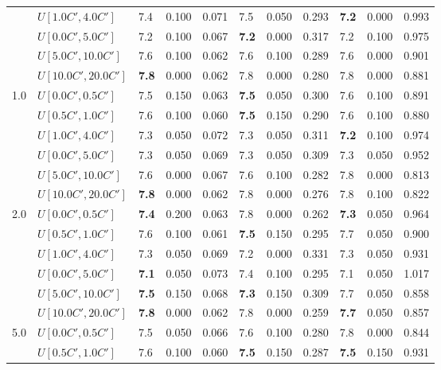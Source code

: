 \begin{table}[h]
{\begin{tabular}{|l|l||l|l|l||l|l|l||l|l|l|}
       & $U[1.0C',4.0C']$ & 7.4 & 0.100 & 0.071 & 7.5 & 0.050 & 0.293 & \textbf{7.2} & 0.000 & 0.993 \\
       & $U[0.0C',5.0C']$ & 7.2 & 0.100 & 0.067 & \textbf{7.2} & 0.000 & 0.317 & 7.2 & 0.100 & 0.975 \\
       & $U[5.0C',10.0C']$ & 7.6 & 0.100 & 0.062 & 7.6 & 0.100 & 0.289 & 7.6 & 0.000 & 0.901 \\
       & $U[10.0C',20.0C']$ & \textbf{7.8} & 0.000 & 0.062 & 7.8 & 0.000 & 0.280 & 7.8 & 0.000 & 0.881 \\
      \hline\hline
      \multirow{6}{*}{1.0} & $U[0.0C',0.5C']$ & 7.5 & 0.150 & 0.063 & \textbf{7.5} & 0.050 & 0.300 & 7.6 & 0.100 & 0.891 \\
       & $U[0.5C',1.0C']$ & 7.6 & 0.100 & 0.060 & \textbf{7.5} & 0.150 & 0.290 & 7.6 & 0.100 & 0.880 \\
       & $U[1.0C',4.0C']$ & 7.3 & 0.050 & 0.072 & 7.3 & 0.050 & 0.311 & \textbf{7.2} & 0.100 & 0.974 \\
       & $U[0.0C',5.0C']$ & 7.3 & 0.050 & 0.069 & 7.3 & 0.050 & 0.309 & 7.3 & 0.050 & 0.952 \\
       & $U[5.0C',10.0C']$ & 7.6 & 0.000 & 0.067 & 7.6 & 0.100 & 0.282 & 7.8 & 0.000 & 0.813 \\
       & $U[10.0C',20.0C']$ & \textbf{7.8} & 0.000 & 0.062 & 7.8 & 0.000 & 0.276 & 7.8 & 0.100 & 0.822 \\
      \hline\hline
      \multirow{6}{*}{2.0} & $U[0.0C',0.5C']$ & \textbf{7.4} & 0.200 & 0.063 & 7.8 & 0.000 & 0.262 & \textbf{7.3} & 0.050 & 0.964 \\
       & $U[0.5C',1.0C']$ & 7.6 & 0.100 & 0.061 & \textbf{7.5} & 0.150 & 0.295 & 7.7 & 0.050 & 0.900 \\
       & $U[1.0C',4.0C']$ & 7.3 & 0.050 & 0.069 & 7.2 & 0.000 & 0.331 & 7.3 & 0.050 & 0.931 \\
       & $U[0.0C',5.0C']$ & \textbf{7.1} & 0.050 & 0.073 & 7.4 & 0.100 & 0.295 & 7.1 & 0.050 & 1.017 \\
       & $U[5.0C',10.0C']$ & \textbf{7.5} & 0.150 & 0.068 & \textbf{7.3} & 0.150 & 0.309 & 7.7 & 0.050 & 0.858 \\
       & $U[10.0C',20.0C']$ & \textbf{7.8} & 0.000 & 0.062 & 7.8 & 0.000 & 0.259 & \textbf{7.7} & 0.050 & 0.857 \\
      \hline\hline
      \multirow{6}{*}{5.0} & $U[0.0C',0.5C']$ & 7.5 & 0.050 & 0.066 & 7.6 & 0.100 & 0.280 & 7.8 & 0.000 & 0.844 \\
       & $U[0.5C',1.0C']$ & 7.6 & 0.100 & 0.060 & \textbf{7.5} & 0.150 & 0.287 & \textbf{7.5} & 0.150 & 0.931 \\

\end{tabular}}
\end{table}
